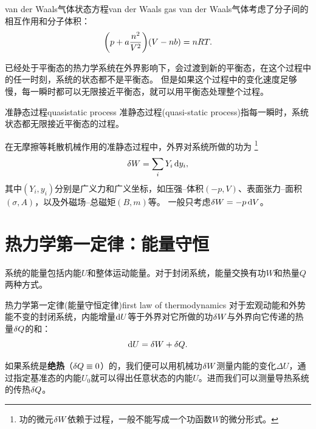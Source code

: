 \begin{example}
	{van der Waals气体状态方程}{van der Waals gas}
	van der Waals气体考虑了分子间的相互作用和分子体积：
	\begin{equation}
		\label{eqn:vdW}
		\biggl(p + a\frac{n^2}{V^2}\biggr)(V - nb) = nRT.
	\end{equation}
\end{example}

已经处于平衡态的热力学系统在外界影响下，会过渡到新的平衡态，在这个过程中的任一时刻，系统的状态都不是平衡态。
但是如果这个过程中的变化速度足够慢，每一瞬时都可以无限接近平衡态，就可以用平衡态处理整个过程。

\begin{definition}{准静态过程}{quasistatic process}
	准静态过程(quasi-static process)指每一瞬时，系统状态都无限接近平衡态的过程。
\end{definition}

\begin{corollary}
	在无摩擦等耗散机械作用的准静态过程中，外界对系统所做的功为
	\footnote{功的微元$\mathop{}\!\delta W$依赖于过程，一般不能写成一个功函数$W$的微分形式。}
	\begin{equation}
		\label{eqn:dW=Ydy}
		\mathop{}\!\delta W = \sum_iY_i\mathop{}\!\mathrm{d} y_i,
	\end{equation}
	其中$(Y_i,y_i)$分别是广义力和广义坐标，如压强--体积$(-p,V)$、表面张力--面积$(\sigma,A)$，以及外磁场--总磁矩$(B,m)$等。
	一般只考虑$\mathop{}\!\delta W = -p\mathop{}\!\mathrm{d} V$。
\end{corollary}

\section{热力学第一定律：能量守恒}

系统的能量包括内能$U$和整体运动能量。对于封闭系统，能量交换有功$W$和热量$Q$两种方式。

\begin{theorem}{热力学第一定律(能量守恒定律)}{first law of thermodynamics}
	对于宏观动能和外势能不变的封闭系统，内能增量$\mathop{}\!\mathrm{d} U$等于外界对它所做的功$\mathop{}\!\delta W$与外界向它传递的热量$\mathop{}\!\delta Q$的和：
	\begin{equation}
		\label{eqn:dU=dW+dQ}
		\mathop{}\!\mathrm{d} U = \mathop{}\!\delta W + \mathop{}\!\delta Q.
	\end{equation}
\end{theorem}

\begin{remark}
	如果系统是\textbf{绝热}（$\mathop{}\!\delta Q \equiv 0$）的，我们便可以用机械功$\mathop{}\!\delta W$测量内能的变化$\Delta U$，通过指定基准态的内能$U_0$就可以得出任意状态的内能$U$。进而我们可以测量导热系统的传热$\mathop{}\!\delta Q$。
\end{remark}

